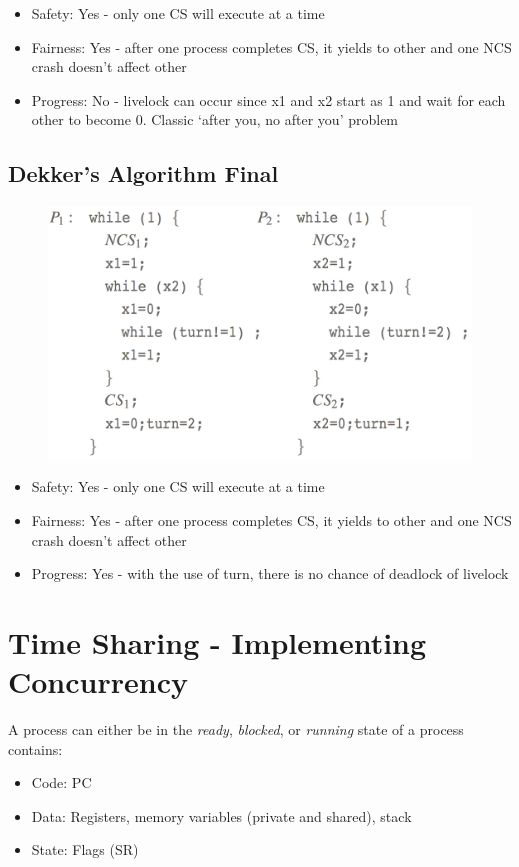 \documentclass{hw}
\begin{document}
\begin{itemize}
  \item Safety:    Yes - only one CS will execute at a time                 
  \item Fairness:  Yes - after one process completes CS, it yields to other and
    one NCS crash doesn't affect other
  \item Progress:  No - livelock can occur since x1 and x2 start as 1 and wait
    for each other to become 0. Classic `after you, no after you' problem                
\end{itemize}

\subsection{Dekker's Algorithm Final}
\begin{figure}[H]
  \centering
  \includegraphics[scale=.4]{img/dekker3}
\end{figure}
                                                                        
\begin{itemize}
  \item Safety:    Yes - only one CS will execute at a time                 
  \item Fairness:  Yes - after one process completes CS, it yields to other and
    one NCS crash doesn't affect other 
  \item Progress:  Yes - with the use of turn, there is no chance of deadlock of livelock       
\end{itemize}


\section{Time Sharing - Implementing Concurrency}
A process can either be in the \emph{ready}, \emph{blocked}, or \emph{running}
state of a process contains:
\begin{itemize}
  \item Code: PC
  \item Data: Registers, memory variables (private and shared), stack
  \item State: Flags (SR) 
\end{itemize}
\end{document}
